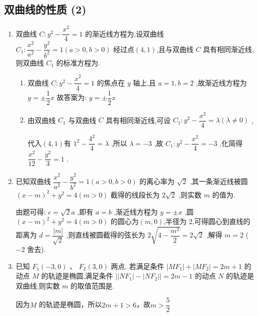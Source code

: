 \clearpage
\subsection*{双曲线的性质 (2)}
\begin{enumerate}
    \item 双曲线 $C : {y}^{2} - \dfrac{{x}^{2}}{4} = 1$ 的渐近线方程为,设双曲线${C}_{1} : \dfrac{{x}^{2}}{{a}^{2}} - \dfrac{{y}^{2}}{{b}^{2}} = 1\left( {a > 0,b > 0}\right)$ 经过点$(4,1)$,且与双曲线 $C$ 具有相同渐近线,则双曲线 ${C}_{1}$ 的标准方程为.
    \begin{jieda}
        \begin{enumerate}
            \item 双曲线 $C : {y}^{2} - \dfrac{{x}^{2}}{4} = 1$ 的焦点在 $y$ 轴上,且 $a = 1,b = 2$ ,故渐近线方程为 $y =  \pm  \dfrac{1}{2}x$ 故答案为: $y =  \pm  \dfrac{1}{2}x$
            \item 由双曲线 ${C}_{1}$ 与双曲线 $C$ 具有相同渐近线,可设 ${C}_{1} : {y}^{2} - \dfrac{{x}^{2}}{4} = \lambda \left( {\lambda  \neq  0}\right)$ ,

            代入$(4,1)$有 ${1}^{2} - \dfrac{{4}^{2}}{4} = \lambda$ ,所以 $\lambda  =  - 3$ ,故 ${C}_{1} : {y}^{2} - \dfrac{{x}^{2}}{4} =  - 3$ ,化简得 $\dfrac{{x}^{2}}{12} - \dfrac{{y}^{2}}{3} = 1$ .
        \end{enumerate}
    \end{jieda}

    \item 已知双曲线 $\dfrac{{x}^{2}}{{a}^{2}} - \dfrac{{y}^{2}}{{b}^{2}} = 1\left( {a > 0,b > 0}\right)$ 的离心率为 $\sqrt{2}$ ,其一条渐近线被圆 ${\left( x - m\right) }^{2} + {y}^{2} = 4\left( {m > 0}\right)$ 截得的线段长为 $2\sqrt{2}$ ,则实数 $m$ 的值为.
    \begin{jieda}
        由题可得: $c = \sqrt{2}a$ ,即有 $a = b$ ,渐近线方程为 $y =  \pm  x$ ,圆 ${\left( x - m\right) }^{2} + {y}^{2} = 4\left( {m > 0}\right)$ 的圆心为$(m,0)$,半径为 2,可得圆心到直线的距离为 ${d} = \dfrac{\left| m\right| }{\sqrt{2}}$ ,则直线被圆截得的弦长为 $2\sqrt{4 - \dfrac{{m}^{2}}{2}} = 2\sqrt{2}$ ,解得 ${m} = 2$ ($-2$ 舍去).
    \end{jieda}

    \item 已知 ${F}_{1}\left( {-3,0}\right) \text{ 、 }{F}_{2}\left( {3,0}\right)$ 两点. 若满足条件 $\left| {M{F}_{1}}\right|  + \left| {M{F}_{2}}\right|  = {2m} + 1$ 的动点 $M$ 的轨迹是椭圆,满足条件 $\left|\left|{N{F}_{1}}\right| - \left| {N{F}_{2}}\right|\right|  = {2m} - 1$ 的动点 $N$ 的轨迹是双曲线,则实数 $m$ 的取值范围是.
    \begin{jieda}
        因为$M$ 的轨迹是椭圆，所以$2m+1 > 6$，故$m > \dfrac{5}{2}$


\end{jieda}
\end{enumerate}
